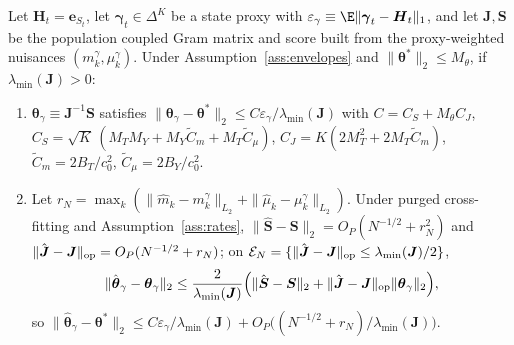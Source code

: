 \begin{theorem}
\label{thm:graceful}
Let $\boldsymbol H_t=\boldsymbol e_{S_t}$, let $\boldsymbol\gamma_t\in\Delta^K$ be a state proxy with
$\varepsilon_\gamma\equiv\E\|\boldsymbol\gamma_t-\boldsymbol H_t\|_1$, and let $\boldsymbol J,\boldsymbol S$ be the
population coupled Gram matrix and score built from the proxy-weighted nuisances
$(m^\gamma_k,\mu^\gamma_k)$. Under Assumption~\ref{ass:envelopes} and $\|\boldsymbol\theta^*\|_2\le M_\theta$,
if $\lambda_{\min}(\boldsymbol J)>0$:
\begin{enumerate}\setlength{\itemsep}{0pt}\setlength{\parskip}{0pt}
\item[(i)] $\boldsymbol\theta_\gamma\equiv\boldsymbol J^{-1}\boldsymbol S$ satisfies
$\|\boldsymbol\theta_\gamma-\boldsymbol\theta^*\|_2\le C\varepsilon_\gamma/\lambda_{\min}(\boldsymbol J)$ with
$C=C_S+M_\theta C_J$, $C_S=\sqrt K\,(M_TM_Y+M_Y\tilde C_m+M_T\tilde C_\mu)$,
$C_J=K(2M_T^2+2M_T\tilde C_m)$, $\tilde C_m=2B_T/c_0^2$, $\tilde C_\mu=2B_Y/c_0^2$.
\item[(ii)] Let $r_N=\max_k(\|\hat m_k-m_k^\gamma\|_{L_2}+\|\hat\mu_k-\mu_k^\gamma\|_{L_2})$. Under purged cross-fitting
and Assumption~\ref{ass:rates}, $\|\hat{\boldsymbol S}-\boldsymbol S\|_2=O_P(N^{-1/2}+r_N^2)$ and
$\|\hat{\boldsymbol J}-\boldsymbol J\|_{\rm op}=O_P(N^{-1/2}+r_N)$; on
$\mathcal E_N=\{\|\hat{\boldsymbol J}-\boldsymbol J\|_{\rm op}\le\lambda_{\min}(\boldsymbol J)/2\}$,
\[
\|\hat{\boldsymbol\theta}_\gamma-\boldsymbol\theta_\gamma\|_2\le\frac{2}{\lambda_{\min}(\boldsymbol J)}\Big(\|\hat{\boldsymbol S}-\boldsymbol S\|_2+\|\hat{\boldsymbol J}-\boldsymbol J\|_{\rm op}\|\boldsymbol\theta_\gamma\|_2\Big),
\]
so $\|\hat{\boldsymbol\theta}_\gamma-\boldsymbol\theta^*\|_2\le C\varepsilon_\gamma/\lambda_{\min}(\boldsymbol J)+O_P\big((N^{-1/2}+r_N)/\lambda_{\min}(\boldsymbol J)\big)$.
\end{enumerate}
\end{theorem}

